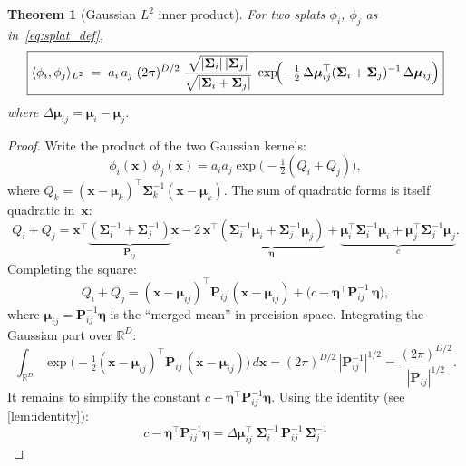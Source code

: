 \documentclass[11pt, a4paper]{article}
\theoremstyle{plain}
\newtheorem{theorem}{Theorem}[section]
\theoremstyle{definition}
\theoremstyle{remark}
\newcommand{\R}{\mathbb{R}}
\newcommand{\bx}{\bm{x}}
\newcommand{\bmu}{\bm{\mu}}
\newcommand{\Sig}{\bm{\Sigma}}
\newcommand{\Prec}{\bm{P}}
\begin{document}
\begin{theorem}[Gaussian $L^2$ inner product]\label{thm:kernel}
For two splats $\phi_i$, $\phi_j$ as in~\eqref{eq:splat_def},
\begin{equation}\label{eq:kernel}
\boxed{
  \langle \phi_i, \phi_j \rangle_{L^2}
  \;=\; a_i\,a_j \;(2\pi)^{D/2}\;
  \frac{\sqrt{|\Sig_i|\,|\Sig_j|}}
       {\sqrt{|\Sig_i + \Sig_j|}}\;
  \exp\!\Bigl(
    -\tfrac{1}{2}\,\Delta\bmu_{ij}^\top
    (\Sig_i + \Sig_j)^{-1}\,\Delta\bmu_{ij}
  \Bigr)
}
\end{equation}
where $\Delta\bmu_{ij} = \bmu_i - \bmu_j$.
\end{theorem}

\begin{proof}
Write the product of the two Gaussian kernels:
\begin{equation}\label{eq:product}
  \phi_i(\bx)\,\phi_j(\bx)
  = a_i a_j \exp\!\bigl(-\tfrac{1}{2}(Q_i + Q_j)\bigr),
\end{equation}
where $Q_k = (\bx - \bmu_k)^\top \Sig_k^{-1}(\bx - \bmu_k)$.
The sum of quadratic forms is itself quadratic in~$\bx$:
\begin{equation}\label{eq:sum_quad}
  Q_i + Q_j
  = \bx^\top \underbrace{(\Sig_i^{-1} + \Sig_j^{-1})}_{\displaystyle\Prec_{ij}} \bx
  - 2\,\bx^\top \underbrace{(\Sig_i^{-1}\bmu_i + \Sig_j^{-1}\bmu_j)}_{\displaystyle\bm{\eta}}
  + \underbrace{\bmu_i^\top\Sig_i^{-1}\bmu_i + \bmu_j^\top\Sig_j^{-1}\bmu_j}_{\displaystyle c}.
\end{equation}
Completing the square:
\begin{equation}\label{eq:complete_square}
  Q_i + Q_j
  = (\bx - \bmu_{ij})^\top \Prec_{ij}\,(\bx - \bmu_{ij})
  + \bigl(c - \bm{\eta}^\top \Prec_{ij}^{-1}\,\bm{\eta}\bigr),
\end{equation}
where $\bmu_{ij} = \Prec_{ij}^{-1}\bm{\eta}$ is the ``merged mean''
in precision space.  Integrating the Gaussian part over $\R^D$:
\begin{equation}
  \int_{\R^D}
    \exp\!\bigl(-\tfrac{1}{2}(\bx - \bmu_{ij})^\top\Prec_{ij}\,(\bx - \bmu_{ij})\bigr)
  \,d\bx
  = (2\pi)^{D/2}\,|\Prec_{ij}^{-1}|^{1/2}
  = \frac{(2\pi)^{D/2}}{|\Prec_{ij}|^{1/2}}.
\end{equation}
It remains to simplify the constant $c - \bm{\eta}^\top\Prec_{ij}^{-1}\bm{\eta}$.
Using the identity (see \cref{lem:identity}):
\begin{equation}\label{eq:constant_simplify}
  c - \bm{\eta}^\top \Prec_{ij}^{-1}\bm{\eta}
  = \Delta\bmu_{ij}^\top\;
    \Sig_i^{-1}\,\Prec_{ij}^{-1}\,\Sig_j^{-1}

\end{equation}
\end{proof}
\end{document}
